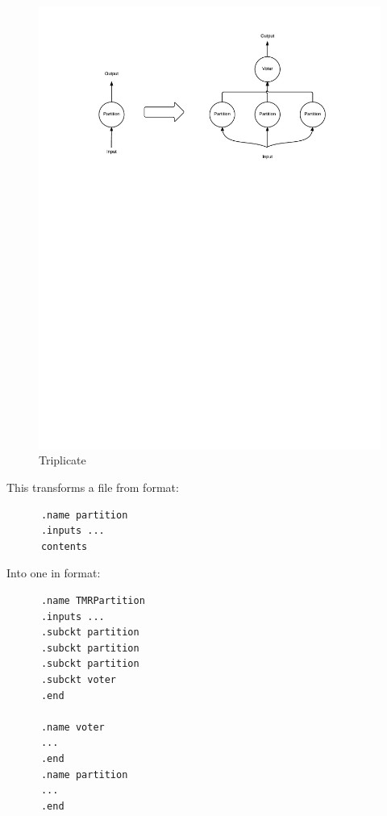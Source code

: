 \documentclass[12pt,final,oneside]{dwThesis} %
\begin{document}
   \begin{figure}
      \begin{center}
         \includegraphics[width=\linewidth]{images/Triplicate.pdf}
         \caption{Triplicate}
         \label{imTriplicate}
      \end{center}
   \end{figure}
   This transforms a file from format:
   \begin{lstlisting}
      .name partition
      .inputs ...
      contents
   \end{lstlisting}
   Into one in format:
   \begin{lstlisting}
      .name TMRPartition
      .inputs ...
      .subckt partition
      .subckt partition
      .subckt partition
      .subckt voter
      .end

      .name voter
      ...
      .end
      .name partition
      ...
      .end
   \end{lstlisting}

   \newpage
\end{document}
